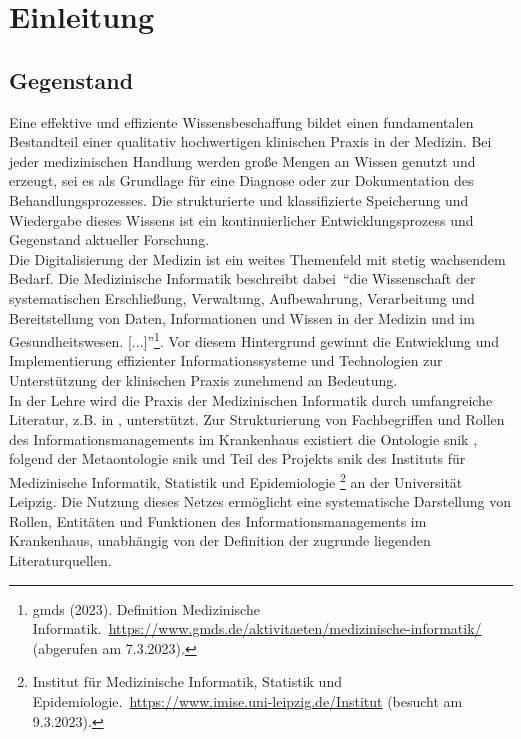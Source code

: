 \chapter{Einleitung}\label{ch:introduction}
\section{Gegenstand}\label{sec:gegenstand}
Eine effektive und effiziente Wissensbeschaffung bildet einen fundamentalen Bestandteil einer qualitativ hochwertigen klinischen Praxis in der Medizin.
Bei jeder medizinischen Handlung werden große Mengen an Wissen genutzt und erzeugt, sei es als Grundlage für eine Diagnose oder zur Dokumentation des Behandlungsprozesses.
Die strukturierte und klassifizierte Speicherung und Wiedergabe dieses Wissens ist ein kontinuierlicher Entwicklungsprozess und Gegenstand aktueller Forschung.\\

Die Digitalisierung der Medizin ist ein weites Themenfeld mit stetig wachsendem Bedarf.
Die Medizinische Informatik beschreibt dabei~\enquote{die Wissenschaft der systematischen Erschließung, Verwaltung, Aufbewahrung, Verarbeitung und Bereitstellung von Daten, Informationen und Wissen in der Medizin und im Gesundheitswesen. [$\dots$]}\footnote{\raggedright{}\ac{gmds} (2023). Definition Medizinische Informatik.\ \url{https://www.gmds.de/aktivitaeten/medizinische-informatik/} (abgerufen am 7.3.2023).}.
Vor diesem Hintergrund gewinnt die Entwicklung und Implementierung effizienter Informationssysteme und Technologien zur Unterstützung der klinischen Praxis zunehmend an Bedeutung.\\

In der Lehre wird die Praxis der Medizinischen Informatik durch umfangreiche Literatur, z.B. in \citet{bb}, unterstützt.
Zur Strukturierung von Fachbegriffen und Rollen des Informationsmanagements im Krankenhaus existiert die Ontologie \ac{snik} \citep{semantischesnetz}, folgend der Metaontologie \ac{snik} und Teil des Projekts \ac{snik} des Instituts für Medizinische Informatik, Statistik und Epidemiologie%
\footnote{\raggedright{}Institut für Medizinische Informatik, Statistik und Epidemiologie.\ \url{https://www.imise.uni-leipzig.de/Institut} (besucht am 9.3.2023).} an der Universität Leipzig.
Die Nutzung dieses Netzes ermöglicht eine systematische Darstellung von Rollen, Entitäten und Funktionen des Informationsmanagements im Krankenhaus, unabhängig von der Definition der zugrunde liegenden Literaturquellen.\\

